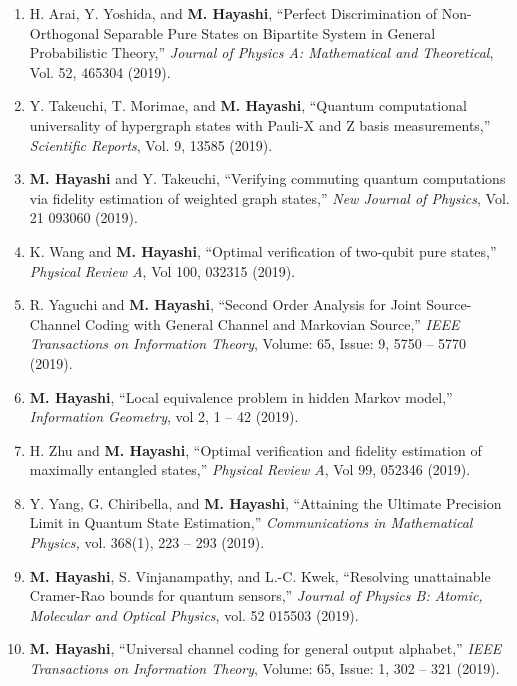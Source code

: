 \documentclass[a4paper,12pt,oneside]{article}
\begin{document}
\begin{enumerate}
\item 
H. Arai, Y. Yoshida, and \textbf{M. Hayashi},
``Perfect Discrimination of Non-Orthogonal Separable Pure States on Bipartite System in General Probabilistic Theory,''
{\em Journal of Physics A: Mathematical and Theoretical}, 
Vol. 52, 465304 (2019).

\item 
Y. Takeuchi, T. Morimae, and \textbf{M. Hayashi},
``Quantum computational
universality of hypergraph states with Pauli-X and Z basis measurements,''
{\em Scientific Reports}, Vol. 9, 13585 (2019).

\item 
\textbf{M. Hayashi} and Y. Takeuchi, 
``Verifying commuting quantum computations via fidelity estimation of weighted graph states,''
{\em New Journal of Physics}, Vol. 21 093060 (2019).

\item 
K. Wang and \textbf{M. Hayashi},
``Optimal verification of two-qubit pure states,''
{\em Physical Review A}, 
Vol 100, 032315 (2019).

\item 
R. Yaguchi and \textbf{M. Hayashi}, 
``Second Order Analysis for Joint Source-Channel Coding with General Channel and Markovian Source,''
{\em IEEE Transactions on Information Theory}, 
Volume: 65, Issue: 9, 5750 -- 5770 (2019). 

\item 
\textbf{M. Hayashi}, 
``Local equivalence problem in hidden Markov model,''
{\em Information Geometry}, 
vol 2, 1 -- 42 (2019). 

\item 
H. Zhu and \textbf{M. Hayashi}, 
``Optimal verification and fidelity estimation of maximally entangled states,''
{\em Physical Review A}, Vol 99, 052346 (2019).

\item 
Y. Yang, G. Chiribella, and \textbf{M. Hayashi}, 
``Attaining the Ultimate Precision Limit in Quantum State Estimation,''
{\em Communications in Mathematical Physics,}
vol. 368(1), 223 -- 293 (2019). 

\item 
\textbf{M. Hayashi}, S. Vinjanampathy, and L.-C. Kwek, 
``Resolving unattainable Cramer-Rao bounds for quantum sensors,''
{\em Journal of Physics B: Atomic, Molecular and Optical Physics},
vol. 52 015503 (2019). 

\item 
\textbf{M. Hayashi},
``Universal channel coding for general output alphabet,'' 
{\em IEEE Transactions on Information Theory},
Volume: 65, Issue: 1, 302 -- 321 (2019). 


\end{enumerate}
\end{document}
